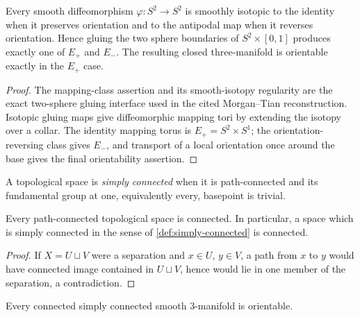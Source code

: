 \begin{lemma}
\label{lem:two-sphere-diffeomorphism-classes}
\notready
Every smooth diffeomorphism $\varphi\colon S^2\to S^2$ is smoothly isotopic
to the identity when it preserves orientation and to the antipodal map when it
reverses orientation.  Hence gluing the two sphere boundaries of
$S^2\times[0,1]$ produces exactly one of $E_+$ and $E_-$.  The resulting
closed three-manifold is orientable exactly in the $E_+$ case.
\end{lemma}

\begin{proof}
The mapping-class assertion and its smooth-isotopy regularity are the exact
two-sphere gluing interface used in the cited Morgan--Tian reconstruction.
Isotopic gluing maps give diffeomorphic mapping tori by extending the isotopy
over a collar.  The identity mapping torus is $E_+=S^2\times S^1$; the
orientation-reversing class gives $E_-$, and transport of a local
orientation once around the base gives the final orientability assertion.
\end{proof}

\begin{definition}
\label{def:simply-connected}
\notready
A topological space is \emph{simply connected} when it is path-connected and
its fundamental group at one, equivalently every, basepoint is trivial.
\end{definition}

\begin{lemma}
\label{lem:path-connected-implies-connected}
\notready
Every path-connected topological space is connected.  In particular, a space
which is simply connected in the sense of \ref{def:simply-connected} is
connected.
\end{lemma}

\begin{proof}
If $X=U\sqcup V$ were a separation and $x\in U$, $y\in V$, a path from $x$
to $y$ would have connected image contained in $U\sqcup V$, hence would lie
in one member of the separation, a contradiction.
\end{proof}

\begin{lemma}
\label{lem:simply-connected-three-manifold-orientable}
\notready
Every connected simply connected smooth $3$-manifold is orientable.
\end{lemma}

